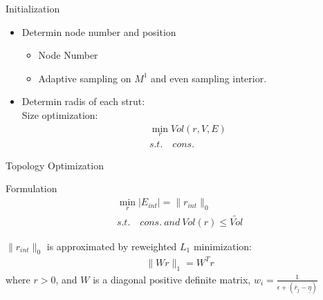 \documentclass{beamer}
\begin{document}
\begin{frame}{Initialization}
\begin{itemize}
\item Determin node number and position
  \begin{itemize}
    \item Node Number
    \item Adaptive sampling on $M^1$ and even sampling interior.
  \end{itemize}
\item Determin radis of each strut: \\
Size optimization:
\begin{eqnarray}
\min_r Vol(r,V,E)\\
s.t. \quad cons.
\end{eqnarray}
\end{itemize}
\end{frame}

\begin{frame}{Topology Optimization}
\begin{block}{Formulation}
\begin{eqnarray}
\min_r |E_{int}| = \|r_{int}\|_0\\
s.t. \quad cons. \: and\: Vol(r) \leq \tilde{Vol}
\end{eqnarray}

$\|r_{int}\|_0$ is approximated by reweighted $L_1$ minimization:
\begin{eqnarray}
\|Wr\|_1 = W^Tr
\end{eqnarray}
where $r>0$, and $W$ is a diagonal positive definite matrix, $w_i = \frac{1}{\epsilon+(\bar{r}_j-\underline{\eta})}$
\end{block}
\end{frame}
\end{document}
